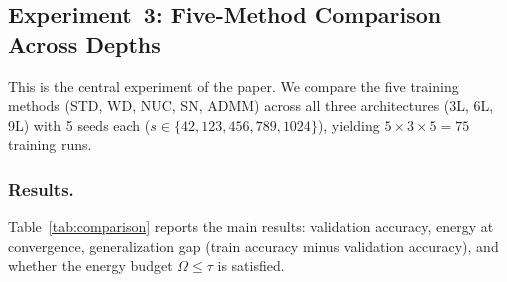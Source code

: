 \documentclass[a4paper,fleqn]{cas-sc}
\theoremstyle{remark}
\theoremstyle{definition}
\begin{document}
\subsection{Experiment~3: Five-Method Comparison Across Depths}\label{sec:exp_comparison}

This is the central experiment of the paper. We compare the five training methods (STD, WD, NUC, SN, ADMM) across all three architectures (3L, 6L, 9L) with 5 seeds each ($s\in\{42,123,456,789,1024\}$), yielding $5\times 3\times 5=75$ training runs.

\subsubsection{Results.}
Table~\ref{tab:comparison} reports the main results: validation accuracy, energy at convergence, generalization gap (train accuracy minus validation accuracy), and whether the energy budget $\Omega\le\tau$ is satisfied.
\end{document}
